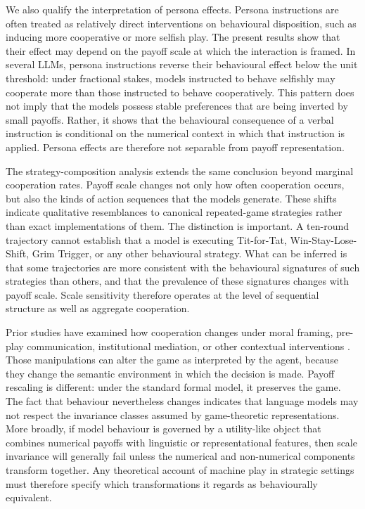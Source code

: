 \documentclass[11pt,a4paper]{article}
\begin{document}
We also qualify the interpretation of persona effects. Persona instructions are often treated as relatively direct interventions on behavioural disposition, such as inducing more cooperative or more selfish play. The present results show that their effect may depend on the payoff scale at which the interaction is framed. In several LLMs, persona instructions reverse their behavioural effect below the unit threshold: under fractional stakes, models instructed to behave selfishly may cooperate more than those instructed to behave cooperatively. This pattern does not imply that the models possess stable preferences that are being inverted by small payoffs. Rather, it shows that the behavioural consequence of a verbal instruction is conditional on the numerical context in which that instruction is applied. Persona effects are therefore not separable from payoff representation.

The strategy-composition analysis extends the same conclusion beyond marginal cooperation rates. Payoff scale changes not only how often cooperation occurs, but also the kinds of action sequences that the models generate. These shifts indicate qualitative resemblances to canonical repeated-game strategies rather than exact implementations of them. The distinction is important. A ten-round trajectory cannot establish that a model is executing Tit-for-Tat, Win-Stay-Lose-Shift, Grim Trigger, or any other  behavioural strategy. What can be inferred is that some trajectories are more consistent with the behavioural signatures of such strategies than others, and that the prevalence of these signatures changes with payoff scale. Scale sensitivity therefore operates at the level of sequential structure as well as aggregate cooperation.


Prior studies have examined how cooperation changes under moral framing, pre-play communication, institutional mediation, or other contextual interventions \cite{buscemi2025strategic,lu2024llms,mao2025alympics,xie2026evolutionary}. Those manipulations can  alter the game as interpreted by the agent, because they change the semantic environment in which the decision is made. 
Payoff rescaling is different: under the standard formal model, it preserves the game. The fact that behaviour nevertheless changes indicates that language models may not respect the invariance classes assumed by game-theoretic representations. More broadly, if model behaviour is governed by a utility-like object that combines numerical payoffs with linguistic or representational features, then scale invariance will generally fail unless the numerical and non-numerical components transform together. Any theoretical account of machine play in strategic settings must therefore specify which transformations it regards as behaviourally equivalent.
\end{document}
